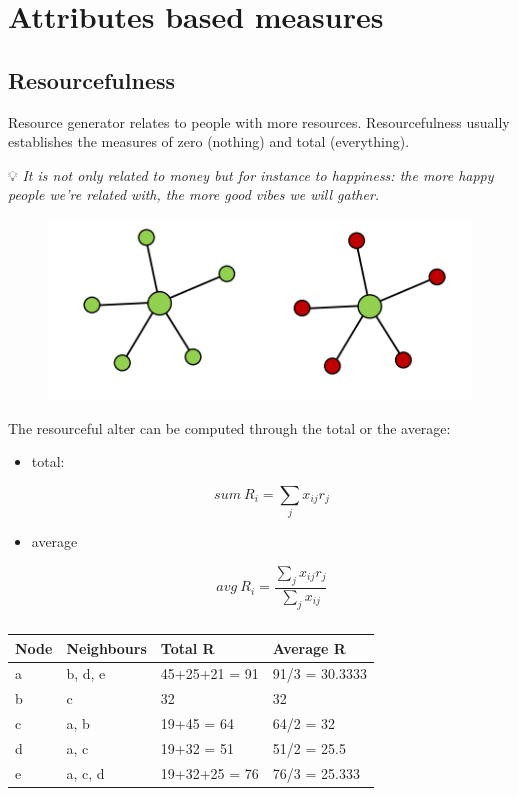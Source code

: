 \documentclass[
  notitlepage,
  onecolumn,
  openany]{book}
\begin{document}
\hypertarget{attributes-based-measures}{%
\chapter{Attributes based measures}\label{attributes-based-measures}}

\hypertarget{resourcefulness}{%
\section{Resourcefulness}\label{resourcefulness}}

Resource generator relates to people with more resources. Resourcefulness usually establishes the measures of zero (nothing) and total (everything).

💡 \emph{It is not only related to money but for instance to happiness: the more happy people we're related with, the more good vibes we will gather.}

\begin{figure}[h!]

{\centering \includegraphics[width=0.5\linewidth]{images/06-Attributes based measures/Untitled} 

}

\end{figure}

The resourceful alter can be computed through the total or the average:

\begin{itemize}
\item
  total:

  \[
    sum \ R_i = \sum_j x_{ij}r_j
    \]
\item
  average

  \[
    avg \ R_i = \frac{ \sum_j x_{ij}r_j}{\sum_j x_{ij}}
    \]
\end{itemize}

\begin{table}[]
\centering
\begin{tabular}{@{}llll@{}}
\toprule
\textbf{Node} & \textbf{Neighbours} & \textbf{Total R} & \textbf{Average R} \\ \midrule
a             & b, d, e             & 45+25+21 = 91    & 91/3 = 30.3333     \\
b             & c                   & 32               & 32                 \\
c             & a, b                & 19+45 = 64       & 64/2 = 32          \\
d             & a, c                & 19+32 = 51       & 51/2 = 25.5        \\
e             & a, c, d             & 19+32+25 = 76    & 76/3 = 25.333      \\ \bottomrule
\end{tabular}
\caption{}
\label{tab:my-table}
\end{table}
\end{document}
